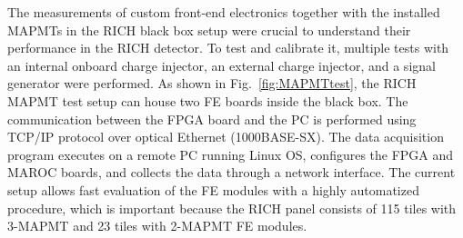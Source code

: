 




The measurements of custom front-end electronics together with the installed MAPMTs in the RICH black box setup were crucial to understand their performance in the RICH detector.
To test and calibrate it, multiple tests with an internal onboard charge injector, an external charge injector, and a signal generator were performed.
As shown in Fig.~\ref{fig:MAPMTtest}, the RICH MAPMT test setup can house two FE boards inside the black box.
The communication between the FPGA board and the PC is performed using TCP/IP protocol over optical Ethernet (1000BASE-SX).
The data acquisition program executes on a remote PC running Linux OS, configures the FPGA and MAROC boards, and collects the data through a network interface.
The current setup allows fast evaluation of the FE modules with a highly automatized procedure, which is important because the RICH panel consists of 115 tiles with 3-MAPMT and 23 tiles with 2-MAPMT FE modules.
